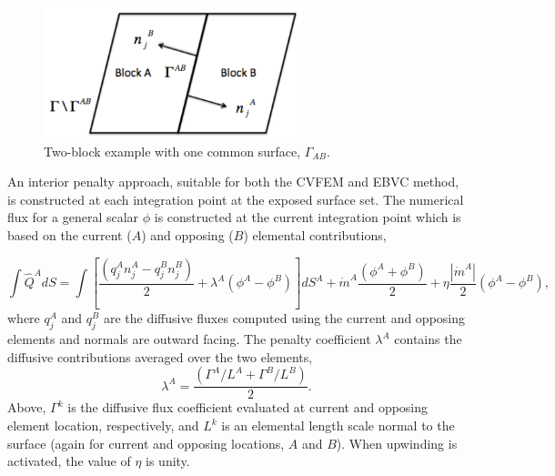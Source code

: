 \begin{figure} 
  \centerline{\includegraphics[height=1.5in]{images/twoBlockDiag.pdf}} 
 \caption{Two-block example with one common surface, $\Gamma_{AB}$.} 
 \label{domainAB} 
\end{figure}    

An interior penalty approach, suitable for both the CVFEM and EBVC method, is constructed 
at each integration point at the exposed surface set. The numerical flux for a general 
scalar $\phi$ is constructed at the current integration point which is based on the current 
($A$) and opposing ($B$) elemental contributions,

\begin{equation} 
  \int \hat Q^A dS = \int [\frac{(q_j^A n_j^A - q_j^B n_j^B)}{2}
       + \lambda^A ( \phi^A - \phi^B) ]dS^A
       + \dot m^A \frac{(\phi^A + \phi^B)}{2} 
       + \eta \frac{|\dot{m}^A|}{2} (\phi^A - \phi^B),
\label{numericalFluxA}
\end{equation}
where $q_j^A$ and $q_j^B$ are the diffusive fluxes computed using the current 
and opposing elements and normals are outward facing. The penalty coefficient $\lambda^A$ contains the diffusive 
contributions averaged over the two elements,
\begin{equation} 
        \lambda^A = \frac{(\Gamma^A / L^A + \Gamma^B / L^B )}{2}.
\label{lamdbaA}
\end{equation}
Above, $\Gamma^k$ is the diffusive flux coefficient evaluated at current and opposing element location, respectively, 
and $L^k$ is an elemental length scale normal to the surface (again for current and opposing locations, $A$ and $B$). 
When upwinding is activated, the value of $\eta$ is unity. 

